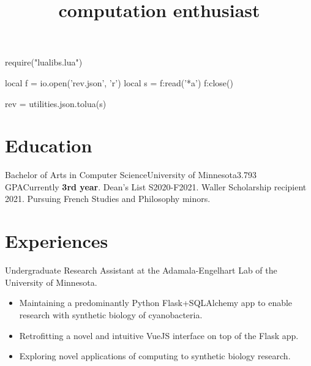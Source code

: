 \documentclass{moderncv}
\title{computation enthusiast}
\newcommand{\comment}[1]{}
\begin{document}
\begin{luacode}
require("lualibs.lua")

local f = io.open('rev.json', 'r')
local s = f:read('*a')
f:close()

rev = utilities.json.tolua(s)
\end{luacode}

\newcommand{\githash}
{
  \href{https://github.com/knownunown/website/blob/\luadirect{tex.sprint(rev)}/cv.tex}
  {\texttt{\luadirect{tex.sprint(rev)}}}
}

\makecvtitle{}
\vspace*{-15mm} %

\section{Education}
{
  Bachelor of Arts in Computer Science}{University of Minnesota}{}{3.793 GPA}{Currently \textbf{3rd year}. Dean's List S2020-F2021. Waller Scholarship recipient 2021. Pursuing French Studies and Philosophy minors.
}

\comment{
\subsection{selected CSCI coursework}
\cvlistitem{CSCI2021, Machine Architecture and Organization}
\cvlistitem{CSCI2041, Advanced Programming Principles}
\cvlistitem{CSCI2033, Elementary Computational Linear Algebra}
\cvlistitem{CSCI5551, Introduction to Intelligent Robotic Systems (in-progress)}
\cvlistitem{CSCI4611, Programming Interactive Computer Graphics and Games (in-progress)}
}

\section{Experiences}
{
  Undergraduate Research Assistant at the Adamala-Engelhart Lab of the University of Minnesota.
  \begin{itemize}[label=\rightarrow,noitemsep]
  \item Maintaining a predominantly Python Flask+SQLAlchemy app to enable research with synthetic biology of cyanobacteria.
  \item Retrofitting a novel and intuitive VueJS interface on top of the Flask app.
  \item Exploring novel applications of computing to synthetic biology research.
  \end{itemize}
}
   
\end{document}
